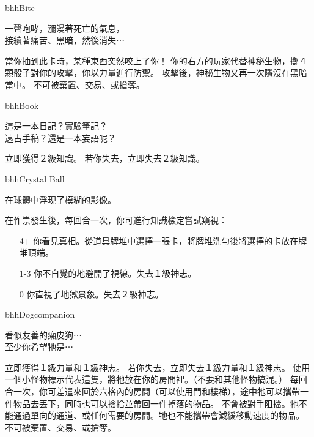 
\begin{OmenCard}{bhh}{Bite}{}
  \begin{CardStory}
    一聲咆哮，瀰漫著死亡的氣息，\\
    接續著痛苦、黑暗，然後消失⋯
  \end{CardStory}
  當你抽到此卡時，某種東西突然咬上了你！\smallbreak
  你的右方的玩家代替神秘生物，擲４顆骰子對你的攻擊，你以力量進行防禦。\smallbreak
  攻擊後，神秘生物又再一次隱沒在黑暗當中。\smallbreak
  \ThisName{}不可被棄置、交易、或搶奪。\smallbreak
\end{OmenCard}%
\linebreak[0]%
\begin{OmenCard}{bhh}{Book}{}
  \begin{CardStory}
    這是一本日記？實驗筆記？\\
    遠古手稿？還是一本妄語呢？
  \end{CardStory}
  立即獲得２級知識。\smallbreak
  若你失去\ThisName{}，立即失去２級知識。\smallbreak
\end{OmenCard}%
\linebreak[0]%
\begin{OmenCard}{bhh}{Crystal Ball}{}
  \begin{CardStory}
    在球體中浮現了模糊的影像。
  \end{CardStory}
  在作祟發生後，每回合一次，你可進行知識檢定嘗試窺視\ThisName{}：
  \begin{itemize}
    \item[4+] 你看見真相。從道具牌堆中選擇一張卡，將牌堆洗勻後將選擇的卡放在牌堆頂端。
    \item[1-3] 你不自覺的地避開了視線。失去１級神志。
    \item[0] 你直視了地獄景象。失去２級神志。
  \end{itemize}
\end{OmenCard}%
\linebreak[0]%
\begin{OmenCard}{bhh}{Dog}{companion}
  \begin{CardStory}
    看似友善的癩皮狗⋯\\
    至少你希望牠是⋯
  \end{CardStory}
  \footnotesize
  立即獲得１級力量和１級神志。\smallbreak
  若你失去\ThisName{}，立即失去１級力量和１級神志。\smallbreak
  使用一個小怪物標示代表這隻\ThisName{}，將牠放在你的房間裡。（不要和其他怪物搞混。）\smallbreak
  每回合一次，你可差遣\ThisName{}來回於六格內的房間（可以使用門和樓梯），途中牠可以攜帶一件物品去丟下，同時也可以撿拾並帶回一件掉落的物品。\smallbreak
  \ThisName{}不會被對手阻擋。牠不能通過單向的通道、或任何需要\RollAny{}的房間。牠也不能攜帶會減緩移動速度的物品。\smallbreak
  \ThisName{}不可被棄置、交易、或搶奪。\smallbreak
\end{OmenCard}%

